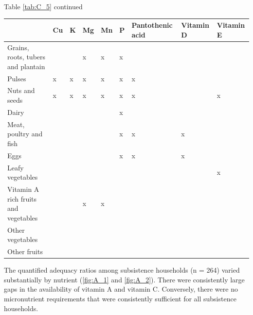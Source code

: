 \begin{table}[H]
  \small
  \raggedright Table \ref{tab:C_5} continued
\begin{tabularx}{\textwidth}%
  {
p{}
p{}
p{}
p{}
p{}
p{}
p{}
p{}
p{}}
\toprule
~ & Cu & K & Mg & Mn & P & Pantothenic acid & Vitamin D & Vitamin E \\
\midrule
Grains, roots, tubers and plantain & & & x & x & x & & & \\
Pulses & x & x & x & x & x & x & & \\
Nuts and seeds & x & x & x & x & x & x & & x \\
Dairy & & & & & x & & & \\
Meat, poultry and fish & & & & & x & x & x & \\
Eggs & & & & & x & x & x & \\
Leafy vegetables & & & & & & & & x \\
Vitamin A rich fruits and vegetables & & & x & x & & & & \\
Other vegetables & & & & & & & & \\
Other fruits & & & & & & & & \\
\bottomrule
\end{tabularx}
\end{table}

\vspace*{\fill}





The quantified adequacy ratios among subsistence households (n = 264) varied substantially by nutrient (\ref{fig:A_1} and \ref{fig:A_2}). There were consistently large gaps in the availability of vitamin A and vitamin C. Conversely, there were no micronutrient requirements that were consistently sufficient for all subsistence households.


